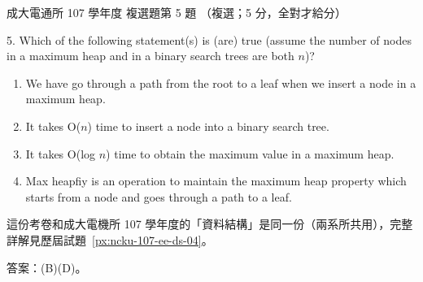 \begin{pastexam}[label={px:ncku-107-cce-04}]{成大電通所 107 學年度 複選題第 5 題}
（複選；5 分，全對才給分）

5. Which of the following statement(s) is (are) true (assume the number of nodes in a maximum heap and in
a binary search trees are both $n$)?
\begin{enumerate}[label=(\Alph*)]
\item We have go through a path from the root to a leaf when we insert a node in a maximum heap.
\item It takes O($n$) time to insert a node into a binary search tree.
\item It takes O(log $n$) time to obtain the maximum value in a maximum heap.
\item Max heapfiy is an operation to maintain the maximum heap property which starts from a node and
goes through a path to a leaf.
\end{enumerate}
\end{pastexam}

\begin{pastsoln}
這份考卷和成大電機所 107 學年度的「資料結構」是同一份（兩系所共用），完整詳解見歷屆試題~\ref{px:ncku-107-ee-ds-04}。

答案：(B)(D)。
\end{pastsoln}

